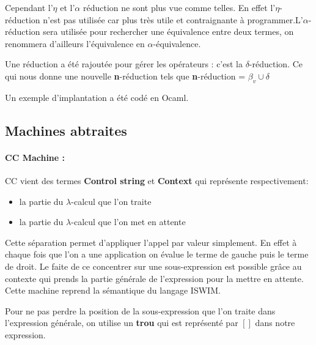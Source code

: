 \documentclass[10pt,a4paper]{article}
\begin{document}
				Cependant l'$\eta$ et l'$\alpha$ réduction ne sont plus vue comme telles. En effet l'$\eta$-réduction n'est pas utilisée car plus très utile et contraignante à programmer.L'$\alpha$-réduction sera utilisée pour rechercher une équivalence entre deux termes, on renommera d'ailleurs l'équivalence en $\alpha$-équivalence.
				\medbreak
				
				Une réduction a été rajoutée pour gérer les opérateurs : c'est la $\delta$-réduction. Ce qui nous donne une nouvelle \textbf{n}-réduction tels que \textbf{n}-réduction = $\beta_{v} \cup \delta$
				\bigbreak
				
				Un exemple d'implantation a été codé en Ocaml.
		
		\subsection{Machines abtraites}
		
			\paragraph{CC Machine :} CC vient des termes \textbf{Control string} et \textbf{Context} qui représente respectivement:
				\begin{itemize}
					\item la partie du $\lambda$-calcul que l'on traite
					\item la partie du $\lambda$-calcul que l'on met en attente 
				\end{itemize}
				Cette séparation permet d'appliquer l'appel par valeur simplement. En effet à chaque fois que l'on a une application on évalue le terme de gauche puis le terme de droit. Le faite de ce concentrer sur une sous-expression est possible grâce au contexte qui prends la partie générale de l'expression pour la mettre en attente. Cette machine reprend la sémantique du langage ISWIM. 
				\medbreak
				
				Pour ne pas perdre la position de la sous-expression que l'on traite dans l'expression générale, on utilise un \textbf{trou} qui est représenté par $[]$ dans notre expression.
				\bigbreak
				
\end{document}
